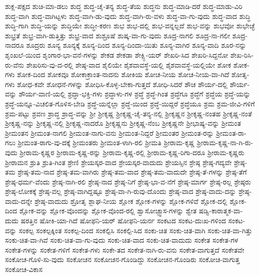 {ಶುಕ್ಲ-ಪಕ್ಷದ
ಶುಚಿ-ಮಾ-ಡಲು
ಶುದ್ಧ
ಶುದ್ಧ-ಚೈ-ತನ್ಯ
ಶುದ್ಧ-ತೆಯ
ಶುದ್ಧನು
ಶುದ್ಧ-ಮಾಡಿ-ದರೆ
ಶುದ್ಧ-ಮಾಡು-ವಿರಿ
ಶುದ್ಧ-ವಾಗಿ
ಶುದ್ಧ-ವಾಗಿಟ್ಟಳು
ಶುದ್ಧ-ವಾಗಿ-ಡು-ವುದು
ಶುದ್ಧ-ವಾಗಿ-ರು-ವಳು
ಶುದ್ಧ-ವಾ-ಗು-ವುದು
ಶುದ್ಧ-ವಾದ
ಶುದ್ಧಿ
ಶುದ್ಧಿ-ಗಾಗಿ
ಶುದ್ಧಿ-ಯನ್ನು
ಶುದ್ಧಿಯೇ
ಶುದ್ಧೀ-ಕರಣ
ಶುಭ
ಶುಭ-ದಲ್ಲಿ
ಶುಭ-ವನ್ನಲ್ಲದೆ
ಶುಭ-ವನ್ನು
ಶುಭವೋ
ಶುಭೇಚ್ಛೆ
ಶುಭ್ರತೆ
ಶುಭ್ರ-ವಾಗಿ-ಡುತ್ತಿತ್ತು
ಶುಭ್ರ-ವಾದ
ಶುಶ್ರೂಷೆ
ಶುಷ್ಕ-ವಾ-ಗು-ವುದು
ಶೂದ್ರ-ನಾಗಲಿ
ಶೂದ್ರ-ನಾ-ಗಲೀ
ಶೂದ್ರ-ನಾದರೂ
ಶೂದ್ರರು
ಶೂನ್ಯ
ಶೂನ್ಯಕ್ಕೆ
ಶೂನ್ಯ-ದಿಂದ
ಶೂನ್ಯ-ದಿಂದಾ-ಯಿತು
ಶೂನ್ಯ-ವಾಗಿರ
ಶೂನ್ಯ-ವಾದಿ
ಶೂರ-ನನ್ನು
ಶೃಂಖಲೆ-ಯಿಂದ
ಶೃಂಗಾರ-ಭಾ-ವನೆ-ಗಳನ್ನು
ಶೇಕಡ
ಶೇಕಡಾ
ಶೇಕ್ಸ್ಪಿ-ಯರ್
ಶೇಖರಿ-ಸಿದ
ಶೇಖರಿ-ಸಿದ್ದನೋ
ಶೇಖ-ರಿಸಿ-ರು-ವೆನು
ಶೇಖರಿಸು-ವು-ದ-ರಲ್ಲಿ
ಶೇಷ್ಠ-ವಾದ
ಶೈಲಿಯೇ
ಶೈಶವಾವಸ್ಥೆ-ಯಲ್ಲಿ
ಶೈಶವಾವಸ್ಥೆ-ಯಲ್ಲಿಯೇ
ಶೋಕ
ಶೋಕ-ಗಳು
ಶೋಕ-ದಿಂದ
ಶೋಕವೂ
ಶೋಕಾಕ್ರಾಂತ-ನಾದನು
ಶೋಕಿಯ
ಶೋಚ-ನೀಯ
ಶೋಚ-ನೀಯ-ವಾ-ಗಿದೆ
ಶೋತೃ-ಗಳು
ಶೋಧ-ಕವೇ
ಶೋಧನೆ-ಗಳನ್ನು
ಶೋಧಿಸಿ-ಕೊಳ್ಳ-ಬೇಕಾ-ಗುತ್ತದೆ
ಶೋಧಿ-ಸಿದರೆ
ಶೌಚ
ಶೌರ್ಯ-ದಲ್ಲಿ
ಶೌರ್ಯ-ವನ್ನು
ಶೌರ್ಯ-ವಾಣಿ-ಯಲ್ಲಿ
ಶ್ರದ್ಧಾ-ಭಕ್ತಿ-ಗಳು
ಶ್ರದ್ಧಾಳು-ಗಳ
ಶ್ರದ್ಧೆ
ಶ್ರದ್ಧೆ-ಗಿಂತ
ಶ್ರದ್ಧೆಗೂ
ಶ್ರದ್ಧೆಗೆ
ಶ್ರದ್ಧೆಯ
ಶ್ರದ್ಧೆ-ಯನ್ನು
ಶ್ರದ್ಧೆ-ಯನ್ನೂ-ವಿಚಲಿತ-ಗೊಳಿಸ-ಬೇಡಿ
ಶ್ರದ್ಧೆ-ಯನ್ನೆಲ್ಲಾ
ಶ್ರದ್ಧೆ-ಯಿಂದ
ಶ್ರದ್ಧೆ-ಯಿದ್ದರೆ
ಶ್ರದ್ಧೆಯೂ
ಶ್ರಮ
ಶ್ರಮ-ಜೀವಿ-ಗಳಿಗೆ
ಶ್ರಮ-ಪಟ್ಟು
ಶ್ರವಣ
ಶ್ರಾದ್ಧ
ಶ್ರಾದ್ಧ-ವನ್ನು
ಶ್ರೀ
ಶ್ರೀಕೃಷ್ಣ
ಶ್ರೀಕೃಷ್ಣ-ಚೈ-ತನ್ಯ-ನಲ್ಲಿ
ಶ್ರೀಕೃಷ್ಣನ
ಶ್ರೀಕೃಷ್ಣ-ನಂತಹ
ಶ್ರೀಕೃಷ್ಣ-ನಂತೆ
ಶ್ರೀಕೃಷ್ಣ-ನನ್ನು
ಶ್ರೀಕೃಷ್ಣ-ನಲ್ಲಿ
ಶ್ರೀಕೃಷ್ಣ-ನಾದರೊ
ಶ್ರೀಕೃಷ್ಣನು
ಶ್ರೀಕೃಷ್ಣ-ನೆಂಬ
ಶ್ರೀಕೃಷ್ಣನೇ
ಶ್ರೀಭಾಷ್ಯ-ವನ್ನು
ಶ್ರೀಮಂತ
ಶ್ರೀಮಂತನ
ಶ್ರೀಮಂತ-ನಾಗಲಿ
ಶ್ರೀಮಂತ-ನಾಗು-ವನು
ಶ್ರೀಮಂತ-ನಿದ್ದರೆ
ಶ್ರೀಮಂತರ
ಶ್ರೀಮಂತ-ರನ್ನು
ಶ್ರೀಮಂತ-ರಾ-ಗಲು
ಶ್ರೀಮಂತ-ರಾಗು-ವು-ದಕ್ಕೆ
ಶ್ರೀಮಂತರು
ಶ್ರೀಮಂತ-ಳಾಗಿ-ರಲಿ
ಶ್ರೀಮತಿ
ಶ್ರೀರಾಮ-ಕೃಷ್ಣ
ಶ್ರೀರಾಮ-ಕೃಷ್ಣ-ನಾ-ಗಿ-ರು-ವುದು
ಶ್ರೀರಾಮ-ಕೃಷ್ಣರ
ಶ್ರೀರಾಮ-ಕೃಷ್ಣ-ರನ್ನು
ಶ್ರೀರಾಮ-ಕೃಷ್ಣ-ರಲ್ಲಿ
ಶ್ರೀರಾಮ-ಕೃಷ್ಣ-ರಿಗಾ-ದರೂ
ಶ್ರೀರಾಮ-ಕೃಷ್ಣರು
ಶ್ರೀರಾಮನ
ಶ್ರುತಿ
ಶ್ರುತಿ-ಗಿಂತ
ಶ್ರೇಣಿ
ಶ್ರೇಯಸ್ಕರ-ವಾದ
ಶ್ರೇಯಸ್ಕರ-ವಾದುದು
ಶ್ರೇಯಸ್ಸಿನ
ಶ್ರೇಷ್ಠ
ಶ್ರೇಷ್ಠ-ಗದ್ಯವೇ
ಶ್ರೇಷ್ಠ-ತಮ
ಶ್ರೇಷ್ಠ-ತಮ-ನಾದ
ಶ್ರೇಷ್ಠ-ತಮ-ವಾಗಿರು
ಶ್ರೇಷ್ಠ-ತಮ-ವಾದ
ಶ್ರೇಷ್ಠ-ತಮ-ವಾದುದೇ
ಶ್ರೇಷ್ಠ-ತೆ-ಗಳನ್ನು
ಶ್ರೇಷ್ಠ-ತೆಗೆ
ಶ್ರೇಷ್ಠ-ಧರ್ಮ-ವೆಂದು
ಶ್ರೇಷ್ಠ-ನಾಗಿ-ರಲಿ
ಶ್ರೇಷ್ಠ-ನಾದ
ಶ್ರೇಷ್ಠ-ನಿಗೆ
ಶ್ರೇಷ್ಠ-ಭಾ-ವ-ನೆಗೆ
ಶ್ರೇಷ್ಠ-ಮಾರ್ಗ
ಶ್ರೇಷ್ಠ-ರಲ್ಲ
ಶ್ರೇಷ್ಠರು
ಶ್ರೇಷ್ಠ-ಲೋಕಕ್ಕೆ
ಶ್ರೇಷ್ಠ-ವಲ್ಲ
ಶ್ರೇಷ್ಠ-ವಾಗಿದ್ದಷ್ಟೂ
ಶ್ರೇಷ್ಠ-ವಾ-ಗಿ-ರುವು-ದೊಂದು
ಶ್ರೇಷ್ಠ-ವಾದ
ಶ್ರೇಷ್ಠ-ವಾದು-ದನ್ನು
ಶ್ರೇಷ್ಠ-ವಾದು-ದನ್ನೇ
ಶ್ರೇಷ್ಠ-ವಾದುದು
ಶ್ರೋತೃ
ಶ್ಲಾಘ-ನೀಯ
ಶ್ಲೋಕ
ಶ್ಲೋಕ-ಗಳನ್ನು
ಶ್ಲೋಕ-ಗಳಿವೆ
ಶ್ಲೋಕ-ದಲ್ಲಿ
ಶ್ಲೋಕ-ದಿಂದ
ಶ್ಲೋಕ-ವನ್ನು
ಶ್ಲೋಕ-ವೊಂದನ್ನು
ಶ್ಲೋಕ-ವೊಂದ-ರಲ್ಲಿ
ಶ್ವಾಸೋಚ್ಫ್ವಾಸ-ಗಳನ್ನು
ಶ್ವೇತ
ಷಡ್ವಿ-ಕಾರಾತ್ಮಕ-ವಾ-ದುದು
ಷರತ್ತಿನ
ಷೋಕಿ-ಯಾ-ಗಿದೆ
ಷೋಫನಿ-ಯರ್
ಷೋಫನಿ-ಯರ್ನ
ಸಂಕಟದ
ಸಂಕಟ-ದುಃಖ-ಗಳಿಂದ
ಸಂಕಟ-ವನ್ನು
ಸಂಕಲ್ಪ
ಸಂಕಲ್ಪಕ್ಕಿಂತ
ಸಂಕಲ್ಪ-ದಿಂದ
ಸಂಕಲ್ಪಿಸಿ
ಸಂಕಲ್ಪಿ-ಸಿದ
ಸಂಕು-ಚಿತ
ಸಂಕು-ಚಿತ-ವಾಗಿ
ಸಂಕು-ಚಿತ-ವಾ-ಗಿತ್ತು
ಸಂಕು-ಚಿತ-ವಾ-ಗಿವೆ
ಸಂಕು-ಚಿತ-ವಾ-ಗು-ವುದು
ಸಂಕು-ಚಿತ-ವಾದ
ಸಂಕು-ಚಿತ-ವಾದುದು
ಸಂಕೇತ
ಸಂಕೇತ-ಗಳ
ಸಂಕೇತ-ಗಳನ್ನು
ಸಂಕೇತ-ಗಳಿಗೆ
ಸಂಕೇತ-ಗಳು
ಸಂಕೇ-ತದ
ಸಂಕೇತ-ನಾಗಿ-ರು-ವನು
ಸಂಕೇತ-ವಾಗುತ್ತದೆ
ಸಂಕೇತವೇ
ಸಂಕೋಚ-ಗೊಳಿ-ಸು-ವುದು
ಸಂಕೋಚನ
ಸಂಕೋಚನ-ಗೊಂಡಿದ್ದು
ಸಂಕೋಚನ-ಗೊಂಡಿರು
ಸಂಕೋಚ-ವಾಗುತ್ತ
ಸಂಕೋಚ-ವಿಕಾಸ
}
